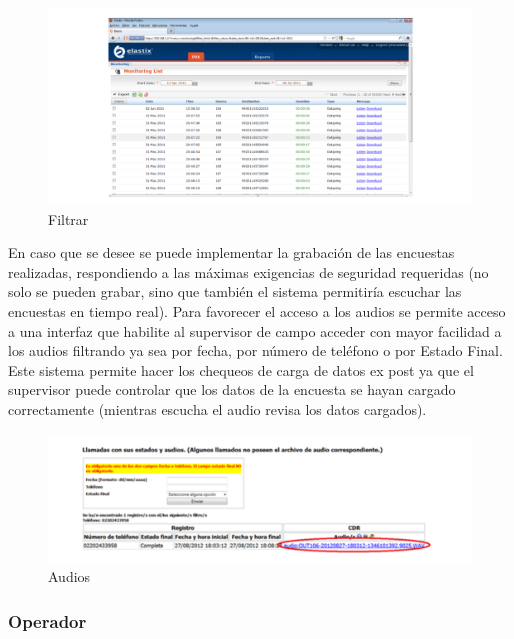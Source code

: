 \documentclass[
  openany]{book}
\begin{document}
\begin{figure}

{\centering \includegraphics[width=1\linewidth]{imagenes/figura6-12} 

}

\caption{Filtrar}\label{fig:Fil}
\end{figure}

En caso que se desee se puede implementar la grabación de las encuestas realizadas, respondiendo a las máximas exigencias de seguridad requeridas (no solo se pueden grabar, sino que también el sistema permitiría escuchar las encuestas en tiempo real). Para favorecer el acceso a los audios se permite acceso a una interfaz que habilite al supervisor de campo acceder con mayor facilidad a los audios filtrando ya sea por fecha, por número de teléfono o por Estado Final. Este sistema permite hacer los chequeos de carga de datos ex post ya que el supervisor puede controlar que los datos de la encuesta se hayan cargado correctamente (mientras escucha el audio revisa los datos cargados).

\begin{figure}

{\centering \includegraphics[width=1\linewidth]{imagenes/figura6-13} 

}

\caption{Audios}\label{fig:Aud}
\end{figure}

\hypertarget{operador}{%
\subsubsection{Operador}\label{operador}}
\end{document}
